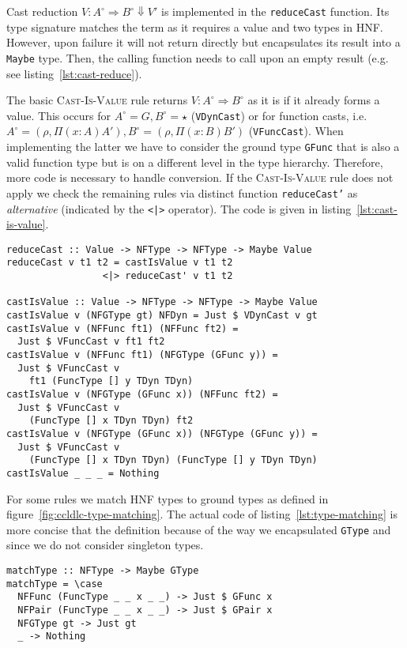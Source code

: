 Cast reduction $V : A^\circ \Rightarrow B^\circ \Downarrow V'$ is implemented in the \texttt{reduceCast} function. Its type signature matches the term as it requires a value and two types in HNF. However, upon failure it will not return \blame directly but encapsulates its result into a \texttt{Maybe} type. Then, the calling function needs to call \blame upon an empty result (e.g. see listing~\ref{lst:cast-reduce}).

The basic \textsc{Cast-Is-Value} rule returns $V : A^\circ \Rightarrow B^\circ$ as it is if it already forms a value. This occurs for $A^\circ = G, B^\circ = \star$ (\texttt{VDynCast}) or for function casts, i.e. $A^\circ=(\rho, \Pi(x:A)A'), B^\circ=(\rho, \Pi(x:B)B')$ (\texttt{VFuncCast}). When implementing the latter we have to consider the ground type \texttt{GFunc} that is also a valid function type but is on a different level in the type hierarchy. Therefore, more code is necessary to handle conversion. If the \textsc{Cast-Is-Value} rule does not apply we check the remaining rules via distinct function \texttt{reduceCast'} as \emph{alternative} (indicated by the \texttt{<|>} operator). The code is given in listing~\ref{lst:cast-is-value}.

\begin{lstlisting}[float,
  caption=Rule \textsc{Cast-Is-Value} (\texttt{Interpreter.hs}),
  label=lst:cast-is-value]
reduceCast :: Value -> NFType -> NFType -> Maybe Value
reduceCast v t1 t2 = castIsValue v t1 t2
                 <|> reduceCast' v t1 t2

castIsValue :: Value -> NFType -> NFType -> Maybe Value
castIsValue v (NFGType gt) NFDyn = Just $ VDynCast v gt
castIsValue v (NFFunc ft1) (NFFunc ft2) =
  Just $ VFuncCast v ft1 ft2
castIsValue v (NFFunc ft1) (NFGType (GFunc y)) =
  Just $ VFuncCast v
    ft1 (FuncType [] y TDyn TDyn)
castIsValue v (NFGType (GFunc x)) (NFFunc ft2) =
  Just $ VFuncCast v
    (FuncType [] x TDyn TDyn) ft2
castIsValue v (NFGType (GFunc x)) (NFGType (GFunc y)) =
  Just $ VFuncCast v
    (FuncType [] x TDyn TDyn) (FuncType [] y TDyn TDyn)
castIsValue _ _ _ = Nothing
\end{lstlisting}

For some rules we match HNF types to ground types as defined in figure~\ref{fig:ccldlc-type-matching}. The actual code of listing~\ref{lst:type-matching} is more concise that the definition because of the way we encapsulated \texttt{GType} and since we do not consider singleton types.

\begin{lstlisting}[float,
  caption=Type matching $A^\circ \rhd G$ (\texttt{Interpreter.hs}),
  label=lst:type-matching]
matchType :: NFType -> Maybe GType
matchType = \case
  NFFunc (FuncType _ _ x _ _) -> Just $ GFunc x
  NFPair (FuncType _ _ x _ _) -> Just $ GPair x
  NFGType gt -> Just gt
  _ -> Nothing
\end{lstlisting}

